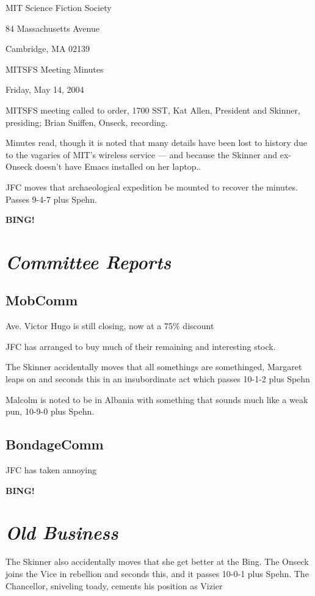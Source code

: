 \documentclass[10pt]{article}
\newcommand{\bing}{{\bf BING!} }
\newcommand{\goto}[1]{\bing \vskip 12pt \section*{{\em{#1}}}}
\newcommand{\ps}{ plus Spehn\xspace}
\begin{document}
\begin{center}

MIT Science Fiction Society 

84 Massachusetts Avenue

Cambridge, MA 02139

\vspace{12pt}

MITSFS Meeting Minutes 

Friday, May 14, 2004


\end{center}
 
\vspace{18pt}

\setlength{\parskip}{6pt}

\noindent
MITSFS meeting called to order, 1700 SST, Kat Allen, President and
Skinner, presiding; Brian Sniffen,  Onseck, recording.

Minutes read, though it is noted that many details have been lost to
history due to the vagaries of MIT's wireless service --- and because
the Skinner and ex-Onseck doesn't have Emacs installed on her laptop..

JFC moves that archaeological expedition be mounted to recover the
minutes.  Passes 9-4-7\ps.

\goto{Committee Reports}
\subsection*{MobComm}
Ave. Victor Hugo is still closing, now at a 75\% discount

JFC has arranged to buy much of their remaining and interesting stock.

The Skinner accidentally moves that all somethings are somethinged,
Margaret leaps on and seconds this in an insubordinate act which
passes 10-1-2\ps

Malcolm is noted to be in Albania with something that sounds much like
a weak pun, 10-9-0\ps.

\subsection*{BondageComm}
JFC has taken annoying 

\goto{Old Business}
The Skinner also accidentally moves that she get better at the Bing.
The Onseck joins the Vice in rebellion and seconds this, and it passes
10-0-1\ps.  The Chancellor, sniveling toady, cements his position as
Vizier 
\end{document}
